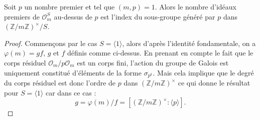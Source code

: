 \documentclass[a4paper]{article} %
\numberwithin{section}{part}
\numberwithin{equation}{section}
\newcommand\zmodninv[1]{(\mathbb{Z}/#1\mathbb{Z})^{\times}}
\newcommand\EO{\mathcal{O}}
\newcommand\groupgen[1]{\langle{#1}\rangle}
\begin{document}
\begin{lem}
\label{lem:nbprimeabove}
Soit $p$ un nombre premier et tel que $(m, p) = 1$. Alors le nombre d'idéaux
premiers de $\EO_m^S$ au-dessus de $p$ est l'index du sous-groupe généré par $p$
dans $\zmodninv{m}/S$.
\end{lem}
\begin{proof}
Commençons par le cas $S = \groupgen{1}$, alors d'après l'identité fondamentale,
on a $\varphi(m) = gf$, $g$ et $f$ définis comme ci-dessus. En prenant en compte
le fait que le corps résiduel $\EO_m/p\EO_m$ est un corps fini, l'action du 
groupe de Galois est uniquement constitué d'éléments de la forme $\sigma_{p^k}$.
Mais cela implique que le degré du corps résiduel est donc l'ordre de $p$ dans 
$\zmodninv{m}$ ce qui donne le résultat pour $S = \groupgen{1}$ car dans ce cas 
:
\begin{equation}
g = \varphi(m)/f = [\zmodninv{m}:\groupgen{p}].
\end{equation}


\end{proof}
\end{document}
